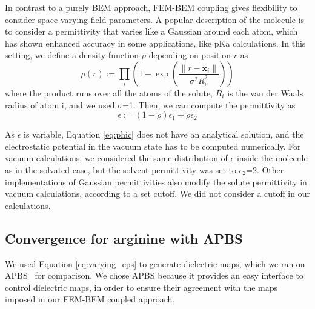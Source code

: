 In contrast to a purely BEM approach, FEM-BEM coupling gives flexibility to consider space-varying field parameters. 
A popular description of the molecule is to consider a permittivity that varies like a Gaussian around each atom,\cite{grant2001smooth} which has shown enhanced accuracy in some applications, like pKa calculations.\cite{li2013dielectric}
In this setting, we define a density function $\rho$ depending on position $r$ as
%
\begin{equation}
\rho(r) := \prod_i \left(1 - \exp{\left(\frac{\|r-\mathbf{x}_i\|}{\sigma^2 R_i^2}\right)}\right)
\end{equation}
%
where the product runs over all the atoms of the solute, $R_i$ is the van der Waals radius of atom i, and we used $\sigma$=1. Then, we can compute the permittivity as
%
\begin{equation}\label{eq:varying_eps}
\epsilon := \left(1-\rho \right) \epsilon_1 + \rho\epsilon_2
\end{equation}

As $\epsilon$ is variable, Equation \eqref{eq:phic} does not have an analytical solution, and the electrostatic potential in the vacuum state has to be computed numerically.
For vacuum calculations, we considered the same distribution of $\epsilon$ inside the molecule as in the solvated case, but the solvent permittivity was set to $\epsilon_2$=2. 
Other implementations of Gaussian permittivities also modify the solute permittivity in vacuum calculations, according to a set cutoff.\cite{li2013dielectric} We did not consider a cutoff in our calculations.



\subsection*{\sffamily \large Convergence for arginine with APBS}

We used Equation \eqref{eq:varying_eps} to generate dielectric maps, which we ran on APBS~\cite{BakerETal2001} for comparison. 
We chose APBS because it provides an easy interface to control dielectric maps, in order to ensure their agreement with the maps imposed in our FEM-BEM coupled approach.

